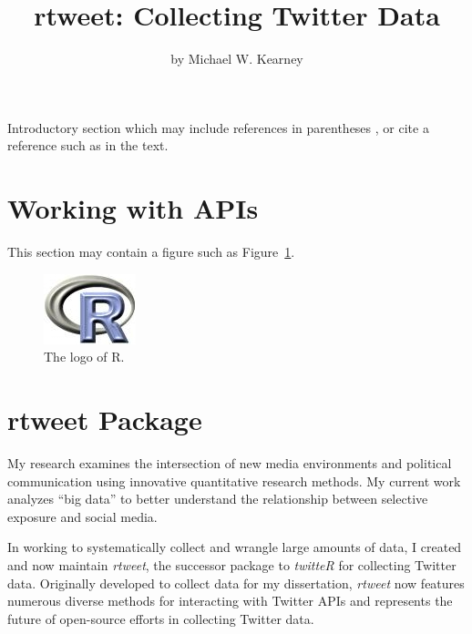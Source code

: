 \title{rtweet: Collecting Twitter Data}
\author{by Michael W. Kearney}

\maketitle


Introductory section which may include references in parentheses
\citep{R}, or cite a reference such as \citet{R} in the text.

\section{Working with APIs}

This section may contain a figure such as Figure~\ref{figure:rlogo}.

\begin{figure}[htbp]
  \centering
  \includegraphics{Rlogo}
  \caption{The logo of R.}
  \label{figure:rlogo}
\end{figure}

\section{rtweet Package}

My research examines the intersection of new media environments and
political communication using innovative quantitative research methods.
My current work analyzes ``big data'' to better understand the
relationship between selective exposure and social media.

In working to systematically collect and wrangle large amounts of data,
I created and now maintain \emph{rtweet}, the successor package to
\emph{twitteR} for collecting Twitter data. Originally developed to collect
data for my dissertation, \emph{rtweet} now features numerous diverse
methods for interacting with Twitter APIs and represents the future of
open-source efforts in collecting Twitter data.

